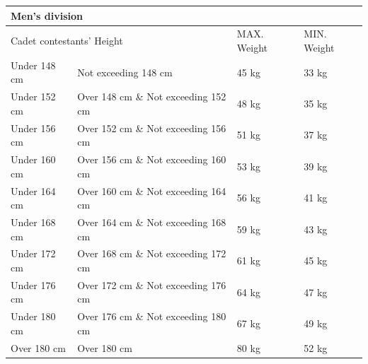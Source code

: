 \documentclass[draft]{report}
\begin{document}
\begin{enumerate}
\begin{enumerate}
\begin{samepage}
    \begin{center}
    \begin{tabular}{ |l|l|l|l| } 
     \hline
     \multicolumn{4}{|l|}{Men's division} \\
     \hline
     \multicolumn{2}{|l|}{Cadet contestants' Height} & MAX. Weight & MIN. Weight  \\
     \hline
     Under 148 cm & Not exceeding 148 cm & 45 kg & 33 kg \\
     \hline
     Under 152 cm & Over 148 cm \& Not exceeding 152 cm & 48 kg & 35 kg \\
     \hline                                                       
     Under 156 cm & Over 152 cm \& Not exceeding 156 cm & 51 kg & 37 kg \\
     \hline                                                       
     Under 160 cm & Over 156 cm \& Not exceeding 160 cm & 53 kg & 39 kg \\
     \hline                                                       
     Under 164 cm & Over 160 cm \& Not exceeding 164 cm & 56 kg & 41 kg \\
     \hline                                                       
     Under 168 cm & Over 164 cm \& Not exceeding 168 cm & 59 kg & 43 kg \\
     \hline                                                       
     Under 172 cm & Over 168 cm \& Not exceeding 172 cm & 61 kg & 45 kg \\
     \hline                                                       
     Under 176 cm & Over 172 cm \& Not exceeding 176 cm & 64 kg & 47 kg \\
     \hline                                                       
     Under 180 cm & Over 176 cm \& Not exceeding 180 cm & 67 kg & 49 kg \\
     \hline
     Over 180 cm & Over 180 cm & 80 kg & 52 kg  \\
     \hline
    \end{tabular}
    \end{center}
    \end{samepage}


\end{enumerate}
\end{enumerate}
\end{document}
